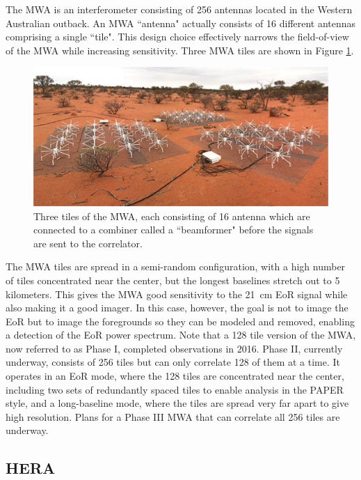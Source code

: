 The MWA is an interferometer consisting of 256 antennas located in the Western Australian
outback. An MWA ``antenna" actually consists of 16 different antennas comprising a single ``tile".
This design choice effectively narrows the field-of-view of the MWA while increasing
sensitivity.  Three MWA tiles are shown in Figure \ref{fig:mwa}.
\begin{figure}[htbp!]
\centering
\includegraphics[width=4.5in]{figures/mwatile.jpg}
\caption{Three tiles of the MWA, each consisting of 16 antenna which are connected to a combiner
called a ``beamformer" before the signals are sent to the correlator.}
\label{fig:mwa}
\end{figure}
The MWA tiles are spread in a semi-random configuration, with a high number of tiles concentrated
near the center, but the longest baselines stretch out to 5 kilometers.  This gives
the MWA good sensitivity to the 21\ cm EoR signal while also making it a good imager.
In this case, however, the goal is not to image the EoR but to image the foregrounds so they can be
modeled and removed, enabling a detection of the EoR power spectrum.
Note that a 128 tile version of the MWA, now referred to as Phase I, completed
observations in 2016.  Phase II, currently underway, consists of 256 tiles but can only correlate
128 of them at a time.  It operates in an EoR mode, where the 128 tiles are concentrated near 
the center, including two sets of redundantly spaced tiles to enable analysis in the PAPER style,
and a long-baseline mode, where the tiles are spread very far apart to give high resolution.  
Plans for a Phase III MWA that can correlate all 256 tiles are underway.

\subsection{HERA}

